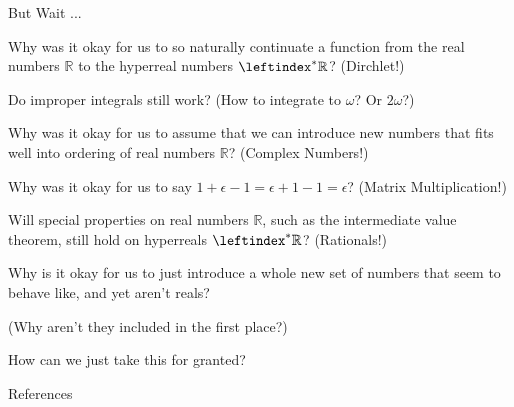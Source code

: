 \documentclass{beamer}
\newcommand{\ls}{\leftindex^*}
\newcommand{\RR}{\mathbb{R}}
\newcommand{\HR}{\ls{\RR}}
\begin{document}
\begin{frame}{But Wait ...} \pause

    Why was it okay for us to so naturally continuate a function from the real numbers \(\RR\) to the hyperreal numbers \(\HR\)? \pause (Dirchlet!) \pause

    Do improper integrals still work? \pause (How to integrate to \(\omega\)? \pause Or \(2\omega\)?)\pause

    \vspace{1pt}

    \large

    Why was it okay for us to assume that we can introduce new numbers that fits well into ordering of real numbers \(\RR\)? \pause \normalsize (Complex Numbers!) \pause

    \vspace{1pt}

    \large

    Why was it okay for us to say \(1 + \epsilon - 1 = \epsilon + 1 - 1 = \epsilon\)? \pause \normalsize (Matrix Multiplication!) \pause

    \vspace{1pt}

    \large

    Will special properties on real numbers \(\RR\), such as the intermediate value theorem, still hold on hyperreals \(\HR\)? \pause \normalsize (Rationals!) \pause

    \vspace{1pt}

    \Large

    Why is it okay for us to just introduce a whole new set of numbers that seem to behave like, and yet aren't reals? \pause

    \normalsize
    (Why aren't they included in the first place?) \pause

    \vspace{1pt}

    \LARGE How can we just take this for granted?
\end{frame}

\begin{frame}{References}
    \printbibliography
\end{frame}
\end{document}
